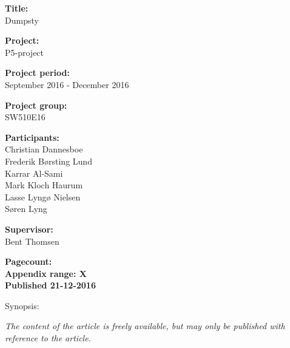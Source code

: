 \begin{minipage}[t]{0.48\textwidth}
\textbf{Title:} \\[5pt]\bigskip\hspace{2ex}
Dumpsty

\textbf{Project:} \\[5pt]\bigskip\hspace{2ex}
P5-project

\textbf{Project period:} \\[5pt]\bigskip\hspace{2ex}
September 2016 - December 2016

\textbf{Project group:} \\[5pt]\bigskip\hspace{2ex}
SW510E16	

\textbf{Participants:} \\[5pt]\hspace*{2ex}
Christian Dannesboe \\\hspace*{2ex}
Frederik Børsting Lund \\\hspace*{2ex}
Karrar Al-Sami \\\hspace*{2ex}
Mark Kloch Haurum \\\hspace*{2ex}
Lasse Lyngø Nielsen \\\hspace*{2ex}
Søren Lyng \\\hspace*{2ex}

\textbf{Supervisor:} \\[5pt]\hspace*{2ex}
Bent Thomsen

\vspace*{1cm}


\textbf{Pagecount: \pageref{LastPage}} \\
\textbf{Appendix range: X} \\ 
\textbf{Published 21-12-2016}

\end{minipage}
\hfill
\begin{minipage}[t]{0.483\textwidth}
Synopsis: \\[5pt]
\fbox{\parbox{7cm}{\bigskip\bigskip}}
\end{minipage}

\vfill

{\footnotesize\itshape The content of the article is freely available, but may only be published with reference to the article.}

